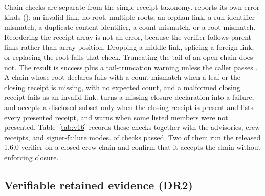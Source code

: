 Chain checks are separate from the single-receipt  taxonomy.  reports its own error kinds (): an invalid link, no root, multiple roots, an orphan link, a run-identifier mismatch, a duplicate content identifier, a count mismatch, or a root mismatch. Reordering the receipt array is not an error, because the verifier follows parent links rather than array position. Dropping a middle link, splicing a foreign link, or replacing the root fails that check. Truncating the tail of an open chain does not. The result is success plus a tail-truncation warning unless the caller passes . A chain whose root declares  fails with a count mismatch when a leaf or the closing receipt is missing, with no expected count, and a malformed closing receipt fails as an invalid link.  turns a missing closure declaration into a failure, and  accepts a disclosed subset only when the closing receipt is present and lists every presented receipt, and warns when some listed members were not presented. Table~\ref{tab:v16} records these checks together with the advisories, crew receipts, and signer-failure modes. \VerifierChecksPassed{} of \VerifierChecks{} checks passed. Two of them run the released 1.6.0 verifier on a closed crew chain and confirm that it accepts the chain without enforcing closure.

\subsection{Verifiable retained evidence (DR2)}

